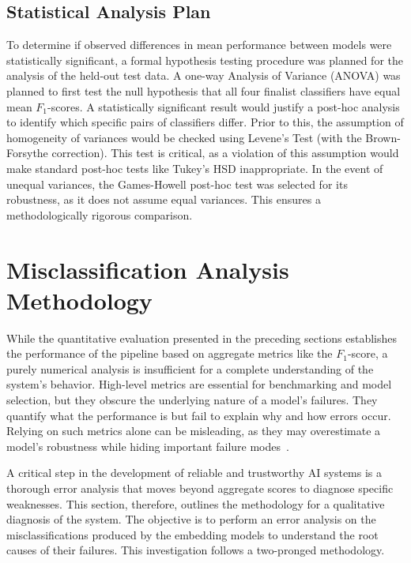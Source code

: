 \subsection{Statistical Analysis Plan}\label{ch:3.4.3}
To determine if observed differences in mean performance between models were statistically significant, a formal hypothesis testing procedure was planned for the analysis of the held-out test data.
A one-way Analysis of Variance (ANOVA) was planned to first test the null hypothesis that all four finalist classifiers have equal mean \(F_1\)-scores. A statistically significant result would justify a post-hoc analysis to identify which specific pairs of classifiers differ. Prior to this, the assumption of homogeneity of variances would be checked using Levene's Test (with the Brown-Forsythe correction). This test is critical, as a violation of this assumption would make standard post-hoc tests like Tukey's HSD inappropriate. In the event of unequal variances, the Games-Howell post-hoc test was selected for its robustness, as it does not assume equal variances. This ensures a methodologically rigorous comparison.

\section{Misclassification Analysis Methodology}\label{ch:3.5}
While the quantitative evaluation presented in the preceding sections establishes the performance of the pipeline based on aggregate metrics like the \(F_1\)-score, a purely numerical analysis is insufficient for a complete understanding of the system's behavior. High-level metrics are essential for benchmarking and model selection, but they obscure the underlying nature of a model's failures. They quantify what the performance is but fail to explain why and how errors occur. Relying on such metrics alone can be misleading, as they may overestimate a model's robustness while hiding important failure modes~\cite{gauthier2022}.

A critical step in the development of reliable and trustworthy AI systems is a thorough error analysis that moves beyond aggregate scores to diagnose specific weaknesses. This section, therefore, outlines the methodology for a qualitative diagnosis of the system. The objective is to perform an error analysis on the misclassifications produced by the embedding models to understand the root causes of their failures. This investigation follows a two-pronged methodology.

